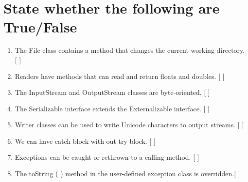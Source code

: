 \documentclass[11pt,a4paper]{article}
\begin{document}
\section*{State whether the following are True/False}
\begin{enumerate}
\item The File class contains a method that changes the current working directory. [   ]
\item  Readers have methods that can read and return floats and doubles. [   ]
\item The InputStream and OutputStream classes are byte-oriented. [   ]
\item The Serializable interface extends the Externalizable interface. [   ]
\item Writer classes can be used to write Unicode characters to output streams. [   ]
\item  We can have catch block with out try block. [   ]
\item  Exceptions can be caught or rethrown to a calling method. [   ]
\item  The toString ( ) method in the user-defined exception class is overridden.[     ]

\end{enumerate}
\end{document}
